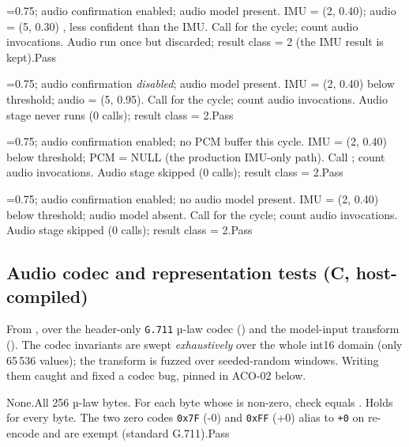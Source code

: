 {=0.75; audio confirmation enabled; audio model present.}
{IMU = (2, 0.40); audio = (5, 0.30) , less confident than the IMU.}
{Call  for the cycle; count audio invocations.}
{Audio run once but discarded; result class = 2 (the IMU result is kept).}{Pass}

{=0.75; audio confirmation \emph{disabled}; audio model present.}
{IMU = (2, 0.40) below threshold; audio = (5, 0.95).}
{Call  for the cycle; count audio invocations.}
{Audio stage never runs (0 calls); result class = 2.}{Pass}

{=0.75; audio confirmation enabled; no PCM buffer this cycle.}
{IMU = (2, 0.40) below threshold; PCM = NULL (the production IMU-only path).}
{Call ; count audio invocations.}
{Audio stage skipped (0 calls); result class = 2.}{Pass}

{=0.75; audio confirmation enabled; no audio model present.}
{IMU = (2, 0.40) below threshold; audio model absent.}
{Call  for the cycle; count audio invocations.}
{Audio stage skipped (0 calls); result class = 2.}{Pass}

\subsection{Audio codec and representation tests (C, host-compiled)}

From , over the header-only \texttt{G.711} µ-law codec
() and the model-input transform (). The codec invariants are
swept \emph{exhaustively} over the whole int16 domain (only 65\,536 values); the transform is fuzzed
over seeded-random windows. Writing them caught and fixed a codec bug, pinned in ACO-02 below.

{None.}{All 256 µ-law bytes.}
{For each byte  whose  is non-zero, check  equals .}
{Holds for every byte. The two zero codes \texttt{0x7F} (-0) and \texttt{0xFF} (+0) alias to \texttt{+0} on re-encode and are exempt (standard G.711).}{Pass}

